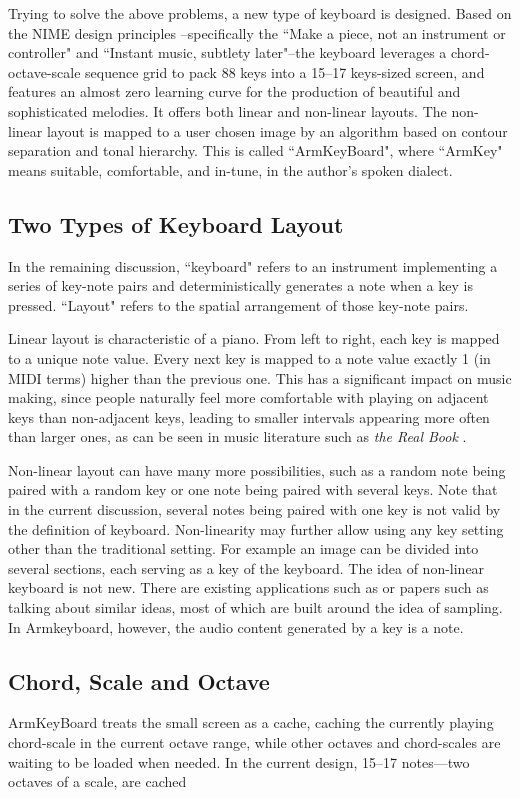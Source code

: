 Trying to solve the above problems, a new type of keyboard is designed. Based on the NIME design principles \cite{cook2001principles}--specifically the ``Make a piece, not an instrument or controller" and ``Instant music, subtlety later"--the keyboard leverages a chord-octave-scale sequence grid to pack 88 keys into a 15--17 keys-sized screen, and features an almost zero learning curve for the production of beautiful and sophisticated melodies. It offers both linear and non-linear layouts. The non-linear layout is mapped to a user chosen image by an algorithm based on contour separation and tonal hierarchy. This is called ``ArmKeyBoard", where ``ArmKey" means suitable, comfortable, and in-tune, in the author's spoken dialect.

\subsection{Two Types of Keyboard Layout}
In the remaining discussion, ``keyboard" refers to an instrument implementing a series of key-note pairs and deterministically
generates a note when a key is pressed. ``Layout" refers to the spatial arrangement of those key-note pairs.

Linear layout is characteristic of a piano. From left to right, each key is mapped to a unique note value. Every next key is mapped to
a note value exactly 1 (in MIDI terms) higher than the previous one. This has a significant impact on music making, since people naturally feel more comfortable with playing on adjacent keys than non-adjacent keys, leading to smaller intervals appearing more often than larger ones, as can be seen in music literature such as \textit{the Real Book} \cite{therealbook6th}.

Non-linear layout can have many more possibilities, such as a random note being paired with a random key or one note being paired with
several keys. Note that in the current discussion, several notes being paired with one key is not valid by the definition of keyboard. Non-linearity may further allow using any key setting other than the traditional setting. For example an image can be divided into several sections, each serving as a key of the keyboard. The idea of non-linear keyboard is not new. There are existing applications such as \cite{kontakts} or papers such as \cite{kruge2011madpad} talking about similar ideas, most of which are built around the idea of sampling. In Armkeyboard, however, the audio content generated by a key is a note.

\subsection{Chord, Scale and Octave}
ArmKeyBoard treats the small screen as a cache, caching the currently playing chord-scale in the current octave range, while other
octaves and chord-scales are waiting to be loaded when needed. In the current design, 15--17 notes---two octaves of a scale, are cached

